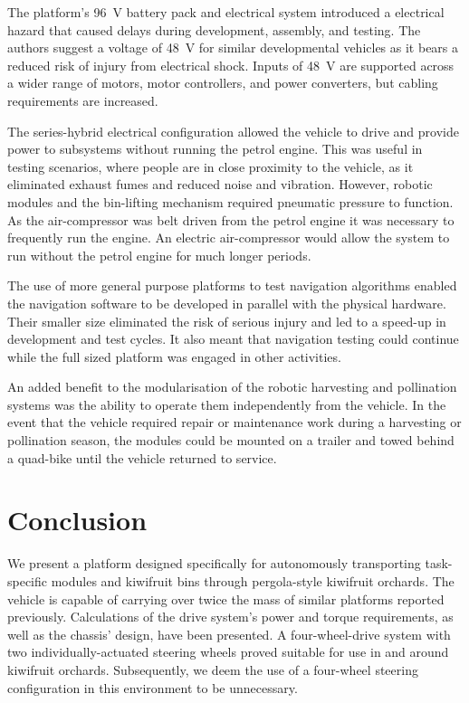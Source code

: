 \documentclass[preprint,authoryear,12pt]{elsarticle}
\begin{document}
    The platform's \SI{96}{\volt} battery pack and electrical system introduced a electrical hazard that caused delays during development, assembly, and testing.
    The authors suggest a voltage of \SI{48}{\volt} for similar developmental vehicles as it bears a reduced risk of injury from electrical shock.
    Inputs of \SI{48}{\volt} are supported across a wider range of motors, motor controllers, and power converters, but cabling requirements are increased.

    The series-hybrid electrical configuration allowed the vehicle to drive and provide power to subsystems without running the petrol engine.
    This was useful in testing scenarios, where people are in close proximity to the vehicle, as it eliminated exhaust fumes and reduced noise and vibration.
    However, robotic modules and the bin-lifting mechanism required pneumatic pressure to function.
    As the air-compressor was belt driven from the petrol engine it was necessary to frequently run the engine.
    An electric air-compressor would allow the system to run without the petrol engine for much longer periods.

    The use of more general purpose platforms to test navigation algorithms enabled the navigation software to be developed in parallel with the physical hardware.
    Their smaller size eliminated the risk of serious injury and led to a speed-up in development and test cycles.
    It also meant that navigation testing could continue while the full sized platform was engaged in other activities.

    An added benefit to the modularisation of the robotic harvesting and pollination systems was the ability to operate them independently from the vehicle.
    In the event that the vehicle required repair or maintenance work during a harvesting or pollination season, the modules could be mounted on a trailer and towed behind a quad-bike until the vehicle returned to service.

\section{Conclusion}
    We present a platform designed specifically for autonomously transporting task-specific modules and kiwifruit bins through pergola-style kiwifruit orchards.
    The vehicle is capable of carrying over twice the mass of similar platforms reported previously.
    Calculations of the drive system's power and torque requirements, as well as the chassis' design, have been presented.
    A four-wheel-drive system with two individually-actuated steering wheels proved suitable for use in and around kiwifruit orchards.
    Subsequently, we deem the use of a four-wheel steering configuration in this environment to be unnecessary.
\end{document}
